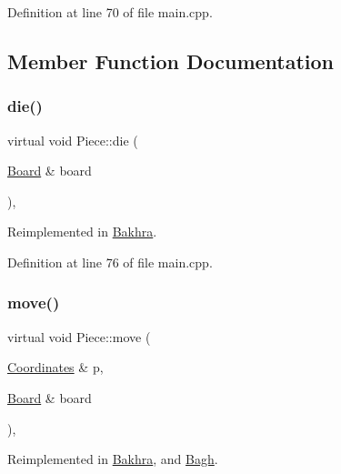 Definition at line 70 of file main.\+cpp.



\subsection{Member Function Documentation}
\mbox{\label{class_piece_a2f3261b1482b5635b6aa0bf67c588b98}} 
\subsubsection{\texorpdfstring{die()}{die()}}
{\footnotesize\ttfamily virtual void Piece\+::die (\begin{DoxyParamCaption}\item[{\mbox{\hyperlink{class_board}{Board}} \&}]{board }\end{DoxyParamCaption})\hspace{0.3cm}{\ttfamily [inline]}, {\ttfamily [virtual]}}



Reimplemented in \mbox{\hyperlink{class_bakhra_a851d699afa7dc2180e1aaf18bd6160f9}{Bakhra}}.



Definition at line 76 of file main.\+cpp.

\mbox{\label{class_piece_a926422c76f09a9f0df374462ad8d13c1}} 
\subsubsection{\texorpdfstring{move()}{move()}}
{\footnotesize\ttfamily virtual void Piece\+::move (\begin{DoxyParamCaption}\item[{\mbox{\hyperlink{class_coordinates}{Coordinates}} \&}]{p,  }\item[{\mbox{\hyperlink{class_board}{Board}} \&}]{board }\end{DoxyParamCaption})\hspace{0.3cm}{\ttfamily [inline]}, {\ttfamily [virtual]}}



Reimplemented in \mbox{\hyperlink{class_bakhra_ad70dced66c2d952d6268ae12d4ebd4f0}{Bakhra}}, and \mbox{\hyperlink{class_bagh_a31917bfad63a224e336bcdfaed2e5361}{Bagh}}.



